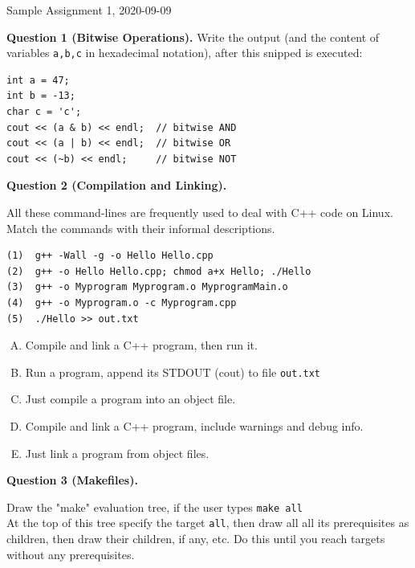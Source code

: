 \documentclass[11pt]{article}
\begin{document}
\thispagestyle{empty}



\begin{center}
{\Large Sample Assignment 1, 2020-09-09}
\end{center}




{\bf Question 1 (Bitwise Operations).} Write the output
(and the content of variables {\tt a,b,c} in hexadecimal notation),
after this snipped is executed:
\begin{Verbatim}[frame=single]
int a = 47;
int b = -13;
char c = 'c';
cout << (a & b) << endl;  // bitwise AND
cout << (a | b) << endl;  // bitwise OR
cout << (~b) << endl;     // bitwise NOT
\end{Verbatim}



\vspace{10pt}
{\bf Question 2 (Compilation and Linking).} 

All these command-lines are frequently used to deal with 
C++ code on Linux. Match the commands with their informal 
descriptions. 

\begin{verbatim}
(1)  g++ -Wall -g -o Hello Hello.cpp
(2)  g++ -o Hello Hello.cpp; chmod a+x Hello; ./Hello
(3)  g++ -o Myprogram Myprogram.o MyprogramMain.o
(4)  g++ -o Myprogram.o -c Myprogram.cpp
(5)  ./Hello >> out.txt
\end{verbatim}

\begin{enumerate}[(A)]
\item Compile and link a C++ program, then run it.
\item Run a program, append its STDOUT (cout) to file {\tt out.txt}
\item Just compile a program into an object file.
\item Compile and link a C++ program, include warnings and debug info.
\item Just link a program from object files.
\end{enumerate}




{\bf Question 3 (Makefiles).} 

Draw the "make" evaluation tree, if the user types {\tt make all}\\
At the top of this tree specify the target {\tt all}, 
then draw all all its prerequisites as children, 
then draw their children, if any, etc. Do this until you reach targets 
without any prerequisites.
\end{document}
